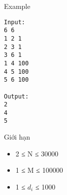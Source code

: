 Example
\begin{verbatim}
Input:
6 6
1 2 1
2 3 1
3 6 1
1 4 100
4 5 100
5 6 100

Output:
2
4 
5

\end{verbatim}
Giới hạn
\begin{itemize}
	\item     2 ≤ N ≤ 30000   
	\item     1 ≤ M ≤ 100000   
	\item     1 ≤ $d_{i}$    ≤ 1000   
\end{itemize}